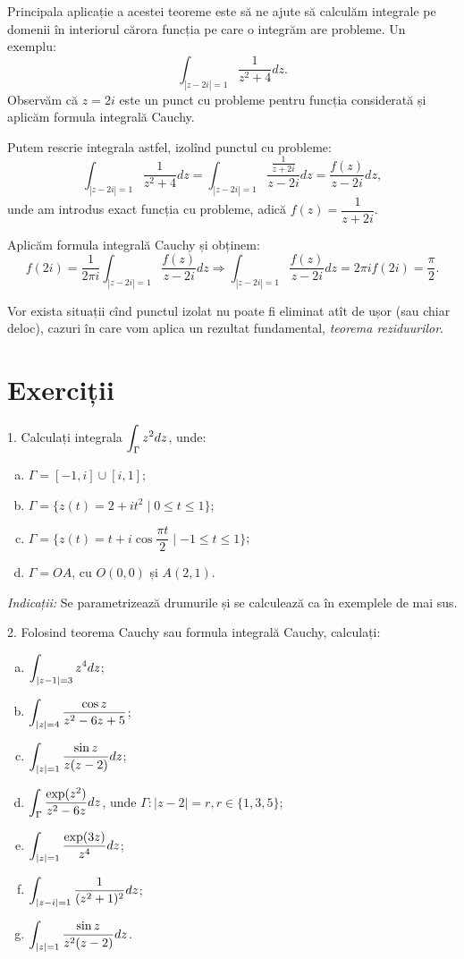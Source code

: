 Principala aplicație a acestei teoreme este să ne ajute să calculăm integrale pe
domenii în interiorul cărora funcția pe care o integrăm are probleme. Un exemplu:
\[
  \int_{|z - 2i| = 1} \dfrac{1}{z^2 + 4} dz.
\]
Observăm că $ z = 2i $ este un punct cu probleme pentru funcția considerată și
aplicăm formula integrală Cauchy.

Putem rescrie integrala astfel, izolînd punctul cu probleme:
\[
  \int_{|z - 2i| = 1} \dfrac{1}{z^2 + 4} dz = \int_{|z - 2i| = 1} \dfrac{\frac{1}{z + 2i}}{z - 2i} dz = %
  \dfrac{f(z)}{z - 2i} dz,
\]
unde am introdus exact funcția cu probleme, adică $ f(z) = \dfrac{1}{z + 2i} $.

Aplicăm formula integrală Cauchy și obținem:
\[
  f(2i) = \dfrac{1}{2\pi i} \int_{|z - 2i| = 1} \dfrac{f(z)}{z - 2i} dz \Rightarrow %
  \int_{|z - 2i| = 1} \dfrac{f(z)}{z - 2i} dz = 2\pi i f(2i) = \dfrac{\pi}{2}.
\]

Vor exista situații cînd punctul izolat nu poate fi eliminat atît de ușor (sau chiar deloc),
cazuri în care vom aplica un rezultat fundamental, \emph{teorema reziduurilor}.


\section{Exerciții}

1. Calculați integrala $ \displaystyle\int_{\Gamma} z^2 dz $, unde:
\begin{enumerate}[(a)]
\item $ \Gamma = [-1, i] \cup [i, 1] $;
\item $ \Gamma = \{ z(t) = 2 + it^2 \mid 0 \leq t \leq 1 \} $;
\item $ \Gamma = \{ z(t) = t + i \cos \dfrac{\pi t}{2} \mid -1 \leq t \leq 1 \} $;
\item $ \Gamma = OA $, cu $O(0, 0) $ și $ A(2, 1) $.
\end{enumerate}

\emph{Indicații:} Se parametrizează drumurile și se calculează ca în exemplele
de mai sus.

\vspace{1cm}

2. Folosind teorema Cauchy sau formula integrală Cauchy, calculați:
\begin{enumerate}[(a)]
\item $ \displaystyle\int_{|z - 1| = 3} z^4 dz $;
\item $ \displaystyle\int_{|z| = 4} \dfrac{\cos z}{z^2 - 6z + 5} $;
\item $ \displaystyle\int_{|z| = 1} \dfrac{\sin z}{z(z-2)} dz $;
\item $ \displaystyle\int_\Gamma \dfrac{\exp(z^2)}{z^2 - 6z} dz $, unde $ \Gamma: |z - 2| = r, r \in \{1, 3, 5\} $;
\item $ \displaystyle\int_{|z| = 1} \dfrac{\exp(3z)}{z^4} dz $;
\item $ \displaystyle\int_{|z - i| = 1} \dfrac{1}{(z^2 + 1)^2} dz $;
\item $ \displaystyle\int_{|z| = 1} \dfrac{\sin z}{z^2(z - 2)} dz $.
\end{enumerate}

